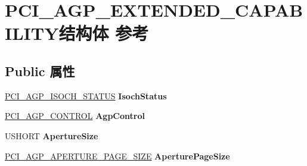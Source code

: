 \hypertarget{struct_p_c_i___a_g_p___e_x_t_e_n_d_e_d___c_a_p_a_b_i_l_i_t_y}{}\section{P\+C\+I\+\_\+\+A\+G\+P\+\_\+\+E\+X\+T\+E\+N\+D\+E\+D\+\_\+\+C\+A\+P\+A\+B\+I\+L\+I\+T\+Y结构体 参考}
\label{struct_p_c_i___a_g_p___e_x_t_e_n_d_e_d___c_a_p_a_b_i_l_i_t_y}
\subsection*{Public 属性}
\begin{DoxyCompactItemize}
\item 
\mbox{\label{struct_p_c_i___a_g_p___e_x_t_e_n_d_e_d___c_a_p_a_b_i_l_i_t_y_a9947c44b92dbd155b77d3ac76caa7a2d}} 
\hyperlink{struct___p_c_i___a_g_p___i_s_o_c_h___s_t_a_t_u_s}{P\+C\+I\+\_\+\+A\+G\+P\+\_\+\+I\+S\+O\+C\+H\+\_\+\+S\+T\+A\+T\+US} {\bfseries Isoch\+Status}
\item 
\mbox{\label{struct_p_c_i___a_g_p___e_x_t_e_n_d_e_d___c_a_p_a_b_i_l_i_t_y_a77550f2d5fcdb6c63f222dcad875f0e1}} 
\hyperlink{struct___p_c_i___a_g_p___c_o_n_t_r_o_l}{P\+C\+I\+\_\+\+A\+G\+P\+\_\+\+C\+O\+N\+T\+R\+OL} {\bfseries Agp\+Control}
\item 
\mbox{\label{struct_p_c_i___a_g_p___e_x_t_e_n_d_e_d___c_a_p_a_b_i_l_i_t_y_a52a695488928681eee502fd52db6ac1d}} 
U\+S\+H\+O\+RT {\bfseries Aperture\+Size}
\item 
\mbox{\label{struct_p_c_i___a_g_p___e_x_t_e_n_d_e_d___c_a_p_a_b_i_l_i_t_y_a8bb4251356b92c5db584ba69c2db8f55}} 
\hyperlink{struct___p_c_i___a_g_p___a_p_e_r_t_u_r_e___p_a_g_e___s_i_z_e}{P\+C\+I\+\_\+\+A\+G\+P\+\_\+\+A\+P\+E\+R\+T\+U\+R\+E\+\_\+\+P\+A\+G\+E\+\_\+\+S\+I\+ZE} {\bfseries Aperture\+Page\+Size}
\item 
\mbox{\label{struct_p_c_i___a_g_p___e_x_t_e_n_d_e_d___c_a_p_a_b_i_l_i_t_y_a3b741ea971fb2bc1bff6f796cd779586}} 

\end{DoxyCompactItemize}
